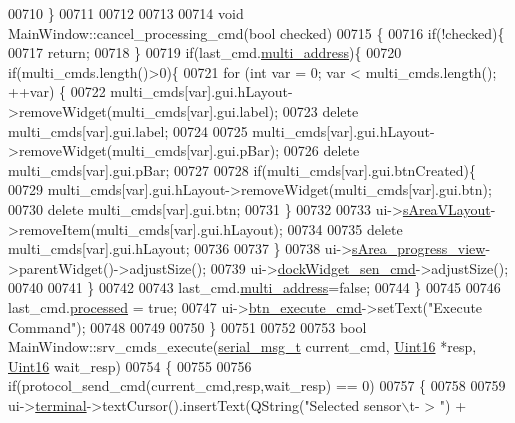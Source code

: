 \begin{DoxyCode}
00710 \}
00711 
00712 
00713 
00714 \textcolor{keywordtype}{void} MainWindow::cancel\_processing\_cmd(\textcolor{keywordtype}{bool} checked)
00715 \{
00716     \textcolor{keywordflow}{if}(!checked)\{
00717         \textcolor{keywordflow}{return};
00718     \}
00719     \textcolor{keywordflow}{if}(last\_cmd.\hyperlink{a00004_a8e69b971c61ced27a7567efd2bf0db59}{multi\_address})\{
00720     \textcolor{keywordflow}{if}(multi\_cmds.length()>0)\{
00721         \textcolor{keywordflow}{for} (\textcolor{keywordtype}{int} var = 0; var < multi\_cmds.length(); ++var) \{
00722             multi\_cmds[var].gui.hLayout->removeWidget(multi\_cmds[var].gui.label);
00723             \textcolor{keyword}{delete} multi\_cmds[var].gui.label;
00724 
00725             multi\_cmds[var].gui.hLayout->removeWidget(multi\_cmds[var].gui.pBar);
00726             \textcolor{keyword}{delete} multi\_cmds[var].gui.pBar;
00727 
00728             \textcolor{keywordflow}{if}(multi\_cmds[var].gui.btnCreated)\{
00729             multi\_cmds[var].gui.hLayout->removeWidget(multi\_cmds[var].gui.btn);
00730             \textcolor{keyword}{delete} multi\_cmds[var].gui.btn;
00731             \}
00732 
00733             ui->\hyperlink{a00080_a2bdce9ad313cd4ee575613f36cbc4678}{sAreaVLayout}->removeItem(multi\_cmds[var].gui.hLayout);
00734 
00735             \textcolor{keyword}{delete} multi\_cmds[var].gui.hLayout;
00736 
00737         \}
00738     ui->\hyperlink{a00080_ae4fe44aa026dd0e84e0f10cdcabca504}{sArea\_progress\_view}->parentWidget()->adjustSize();
00739     ui->\hyperlink{a00080_a9eb86a5ee396766f0f4a65f2d2bd7688}{dockWidget\_sen\_cmd}->adjustSize();
00740 
00741     \}
00742 
00743     last\_cmd.\hyperlink{a00004_a8e69b971c61ced27a7567efd2bf0db59}{multi\_address}=\textcolor{keyword}{false};
00744    \}
00745 
00746     last\_cmd.\hyperlink{a00004_a3e88f779da9798a5da7dda227e2ca388}{processed} = \textcolor{keyword}{true};
00747     ui->\hyperlink{a00080_a9ea50d44e38316e4203933698cbc14a6}{btn\_execute\_cmd}->setText(\textcolor{stringliteral}{"Execute Command"});
00748 
00749 
00750 \}
00751 
00752 
00753 \textcolor{keywordtype}{bool} MainWindow::srv\_cmds\_execute(\hyperlink{a00004_d3/dd5/a00215}{serial\_msg\_t} current\_cmd, \hyperlink{a00004_aae7407b021d43f7193a81a58cfb3e297}{Uint16} *resp, 
      \hyperlink{a00004_aae7407b021d43f7193a81a58cfb3e297}{Uint16} wait\_resp)
00754 \{
00755 
00756       \textcolor{keywordflow}{if}(protocol\_send\_cmd(current\_cmd,resp,wait\_resp) == 0)
00757       \{
00758 
00759       ui->\hyperlink{a00080_aae71c46ea4546df5994735dee573b2dd}{terminal}->textCursor().insertText(QString(\textcolor{stringliteral}{"Selected sensor\(\backslash\)t- > "}) +

\end{DoxyCode}
